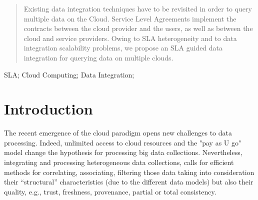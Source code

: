 \documentclass[10pt, conference, compsocconf]{IEEEtran}
\begin{document}




\maketitle


\begin{abstract}
Existing data integration techniques have to be revisited in order to query multiple data on the Cloud.
Service Level Agreements implement the contracts between the cloud provider and the users, as well as between  the cloud and service providers. 
Owing to SLA heterogeneity and to data integration scalability problems, we propose an SLA guided data integration for querying data on multiple clouds.
\end{abstract}

\begin{IEEEkeywords}
SLA; Cloud Computing; Data Integration;
\end{IEEEkeywords}


%
\IEEEpeerreviewmaketitle



\section{Introduction}
%

The recent emergence of  the cloud paradigm opens new challenges to data processing. Indeed, unlimited access to cloud resources and the "pay as U go" model change the hypothesis for processing big data collections.
Nevertheless, integrating and processing heterogeneous data collections, calls for efficient methods for correlating, associating, filtering those data taking into consideration their “structural” characteristics (due to the different data models) but also their quality, e.g., trust, freshness, provenance, partial or total consistency.
\end{document}
